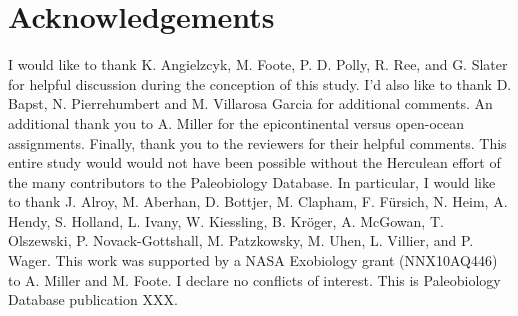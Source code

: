 \documentclass{article}
\begin{document}
\section*{Acknowledgements}
I would like to thank K. Angielzcyk, M. Foote, P. D. Polly, R. Ree, and G. Slater for helpful discussion during the conception of this study. I'd also like to thank D. Bapst, N. Pierrehumbert and M. Villarosa Garcia for additional comments. An additional thank you to  A. Miller for the epicontinental versus open-ocean assignments. Finally, thank you to the reviewers for their helpful comments. This entire study would would not have been possible without the Herculean effort of the many contributors to the Paleobiology Database. In particular, I would like to thank J. Alroy, M. Aberhan, D. Bottjer, M. Clapham, F. F\"{u}rsich, N. Heim, A. Hendy, S. Holland, L. Ivany, W. Kiessling, B. Kr\"{o}ger, A. McGowan, T. Olszewski, P. Novack-Gottshall, M. Patzkowsky, M. Uhen, L. Villier, and P. Wager. This work was supported by a NASA Exobiology grant (NNX10AQ446) to A. Miller and M. Foote. I declare no conflicts of interest. This is Paleobiology Database publication XXX.

\clearpage




\clearpage
\end{document}
